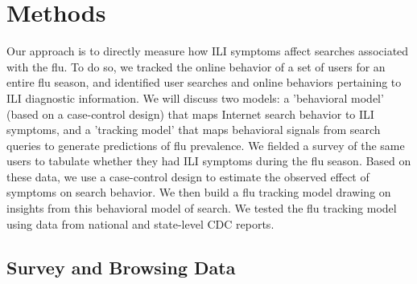\documentclass[fleqn,10pt]{wlscirep}
\begin{document}




\section*{Methods}

Our approach is to directly measure how ILI symptoms affect searches associated with the flu. To do so, we tracked the online behavior of a set of users for an entire flu season, and identified user searches and online behaviors pertaining to ILI diagnostic information. We will discuss two models: a 'behavioral model' (based on a case-control design) that maps Internet search behavior to ILI symptoms, and a 'tracking model' that maps behavioral signals from search queries to generate predictions of flu prevalence. We fielded a survey of the same users to tabulate whether they had ILI symptoms during the flu season. Based on these data, we use a case-control design to estimate the observed effect of symptoms on search behavior. We then build a flu tracking model drawing on insights from this behavioral model of search. We tested the flu tracking model using data from national and state-level CDC reports.  

\subsection*{Survey and Browsing Data}
\end{document}
